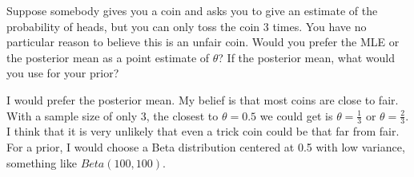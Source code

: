 \documentclass[12pt,letterpaper]{article}
\begin{document}
\begin{problem}{7.5}
     Suppose somebody gives you a coin and asks you to give
    an estimate of the probability of heads, but you can only toss the
    coin $3$ times. You have no particular reason to believe this is
    an unfair coin. Would you prefer the MLE or the posterior mean as
    a point estimate of $\theta$? If the posterior mean, what would you
    use for your prior?
\end{problem}
\begin{solution}{}
    I would prefer the posterior mean. My belief is that most coins are close to fair. With a sample size of only 3, the closest to 
    $\theta=0.5$ we could get is $\theta=\frac{1}{3}$ or $\theta=\frac{2}{3}$. I think that it is very unlikely that even a trick coin could 
    be that far from fair. For a prior, I would choose a Beta distribution centered at 0.5 with low variance, something like $Beta(100,100)$.
\end{solution}
\end{document}
